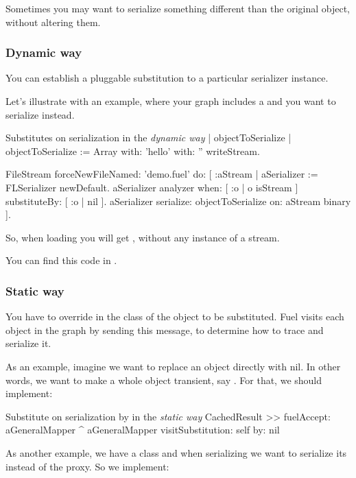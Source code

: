\documentclass[a4paper,10pt,twoside]{book}
\begin{document}
Sometimes you may want to serialize something different than the original object, without altering them.


\subsubsection{Dynamic way}

You can establish a pluggable substitution to a particular serializer instance. 

Let's illustrate with an example, where your graph includes a  and you want to serialize  instead. 

\begin{code}{Substitutes on serialization in the \emph{dynamic way}}
| objectToSerialize |
objectToSerialize := Array with: 'hello' with: '' writeStream.

FileStream forceNewFileNamed: 'demo.fuel' do: [ :aStream |
    aSerializer := FLSerializer newDefault.
    aSerializer analyzer 
        when: [ :o | o isStream ] 
        substituteBy: [ :o | nil ].
    aSerializer         
        serialize: objectToSerialize
        on: aStream binary ].
\end{code}

So, when loading you will get , without any instance of a stream.

You can find this code in .


\subsubsection{Static way}

You have to override  in the class of the object to be substituted. Fuel visits each object in the graph by sending this message, to determine how to trace and serialize it.

As an example, imagine we want to replace an object directly with nil. In other words, we want to make a whole object transient, say . For that, we should implement:

\begin{code}{Substitute on serialization by  in the \emph{static way}}
CachedResult >> fuelAccept: aGeneralMapper
    ^ aGeneralMapper visitSubstitution: self by: nil
\end{code}

As another example, we have a  class and when serializing we want to serialize its  instead of the proxy. So we implement:
\end{document}
